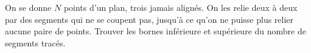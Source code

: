 On se donne $N$ points d'un plan, trois jamais alignés. On les relie deux à deux par des segments qui ne se coupent pas, jusqu'à ce qu'on ne puisse plus relier aucune paire de points. Trouver les bornes inférieure et supérieure du nombre de segments tracés.
